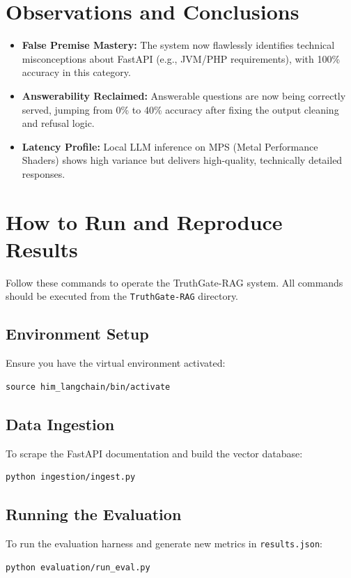 \documentclass[11pt]{article}
\begin{document}
\section{Observations and Conclusions}
\begin{itemize}
  \item \textbf{False Premise Mastery:} The system now flawlessly identifies technical misconceptions about FastAPI (e.g., JVM/PHP requirements), with 100\% accuracy in this category.
  \item \textbf{Answerability Reclaimed:} Answerable questions are now being correctly served, jumping from 0\% to 40\% accuracy after fixing the output cleaning and refusal logic.
  \item \textbf{Latency Profile:} Local LLM inference on MPS (Metal Performance Shaders) shows high variance but delivers high-quality, technically detailed responses.
\end{itemize}

\section{How to Run and Reproduce Results}
Follow these commands to operate the TruthGate-RAG system. All commands should be executed from the \texttt{TruthGate-RAG} directory.

\subsection{Environment Setup}
Ensure you have the virtual environment activated:
\begin{verbatim}
source him_langchain/bin/activate
\end{verbatim}

\subsection{Data Ingestion}
To scrape the FastAPI documentation and build the vector database:
\begin{verbatim}
python ingestion/ingest.py
\end{verbatim}

\subsection{Running the Evaluation}
To run the evaluation harness and generate new metrics in \texttt{results.json}:
\begin{verbatim}
python evaluation/run_eval.py
\end{verbatim}
\end{document}
